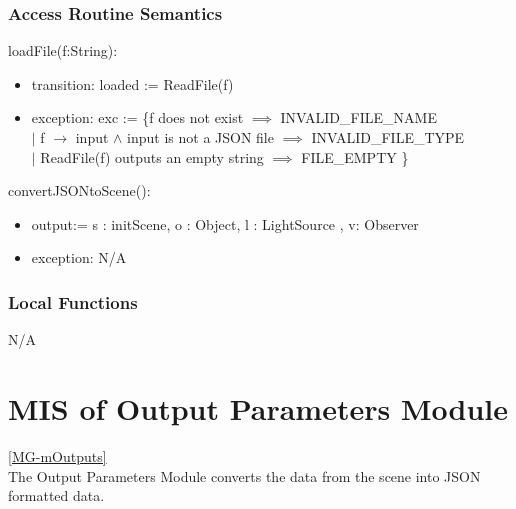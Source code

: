 \documentclass[12pt, titlepage]{article}
\begin{document}
\subsubsection{Access Routine Semantics}
\noindent loadFile(f:String):
\begin{itemize}
	\item transition: loaded := ReadFile(f) 
	\item exception: exc := \{f does not exist $\implies$ INVALID\_FILE\_NAME\\
	$|$ f $\to$ input $\land$ input is not a JSON file $\implies$ 
	INVALID\_FILE\_TYPE\\
	$|$ ReadFile(f) outputs an empty string $\implies$ FILE\_EMPTY
	\}
\end{itemize}

\noindent convertJSONtoScene(): 

\begin{itemize}
	\item output:= s : initScene, o : Object, l : LightSource , v: Observer 
	\item exception: N/A
\end{itemize}

\subsubsection{Local Functions}
N/A

\newpage

\section{MIS of Output Parameters Module} \ref{MG-mOutputs} \\
The Output Parameters Module converts the data from the scene into JSON 
formatted data.
\end{document}
